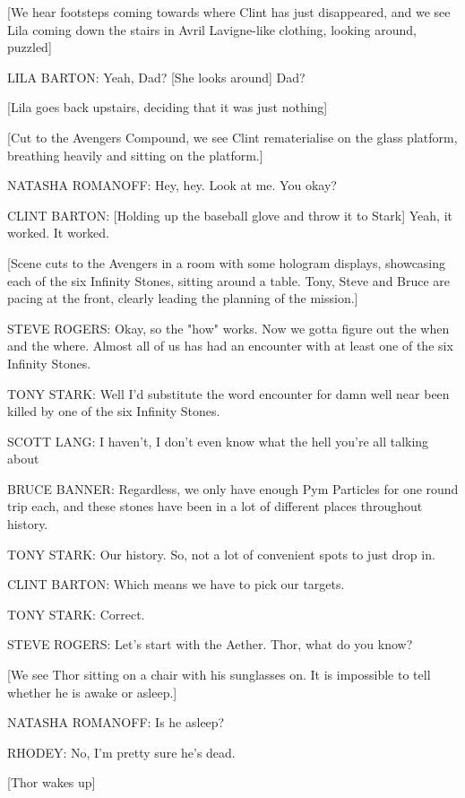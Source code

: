 [We hear footsteps coming towards where Clint has just disappeared, and we see Lila coming down the stairs in Avril Lavigne-like clothing, looking around, puzzled]

LILA BARTON: Yeah, Dad? [She looks around] Dad?

[Lila goes back upstairs, deciding that it was just nothing]

[Cut to the Avengers Compound, we see Clint rematerialise on the glass platform, breathing heavily and sitting on the platform.]

NATASHA ROMANOFF: Hey, hey. Look at me. You okay?

CLINT BARTON: [Holding up the baseball glove and throw it to Stark] Yeah, it worked. It worked.

[Scene cuts to the Avengers in a room with some hologram displays, showcasing each of the six Infinity Stones, sitting around a table. Tony, Steve and Bruce are pacing at the front, clearly leading the planning of the mission.]

STEVE ROGERS: Okay, so the "how" works. Now we gotta figure out the when and the where. Almost all of us has had an encounter with at least one of the six Infinity Stones.

TONY STARK: Well I'd substitute the word encounter for damn well near been killed by one of the six Infinity Stones.

SCOTT LANG: I haven't, I don't even know what the hell you're all talking about

BRUCE BANNER: Regardless, we only have enough Pym Particles for one round trip each, and these stones have been in a lot of different places throughout history.

TONY STARK: Our history. So, not a lot of convenient spots to just drop in.

CLINT BARTON: Which means we have to pick our targets.

TONY STARK: Correct.

STEVE ROGERS: Let's start with the Aether. Thor, what do you know?

[We see Thor sitting on a chair with his sunglasses on. It is impossible to tell whether he is awake or asleep.]

NATASHA ROMANOFF: Is he asleep?

RHODEY: No, I'm pretty sure he's dead.

[Thor wakes up]

